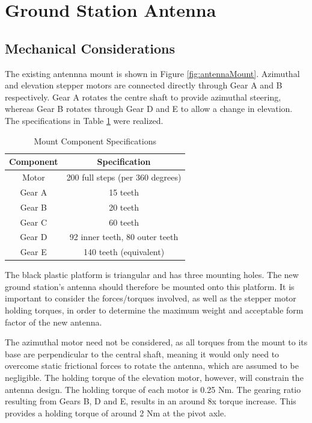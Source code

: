 \graphicspath{{./figures}}

\section{Ground Station Antenna}
\subsection{Mechanical Considerations}

The existing antennna mount is shown in Figure \ref{fig:antennaMount}. Azimuthal and elevation stepper motors are connected directly through Gear A and B respectively. Gear A rotates the centre shaft to provide azimuthal steering, whereas Gear B rotates through Gear D and E to allow a change in elevation. The 
specifications in Table \ref{tab:mount_specifications} were realized.

\begin{table}[!htb]
  \centering
  \renewcommand{\arraystretch}{1.2}
  \begin{tabular}{ |c|c| }
  \hline
  \textbf{Component}        & \textbf{Specification}    \\
  \hline
  Motor         & 200 full steps (per 360 degrees) \\ \hline
  Gear A        & 15 teeth \\ \hline
  Gear B        & 20 teeth \\ \hline
  Gear C        & 60 teeth \\ \hline
  Gear D        & 92 inner teeth, 80 outer teeth \\ \hline
  Gear E        & 140 teeth (equivalent) \\ \hline
  \end{tabular}
  \caption{Mount Component Specifications}
  \label{tab:mount_specifications}
\end{table}

The black plastic platform is triangular and has three mounting holes. The new ground station's antenna should therefore be mounted onto this platform. It is important to consider the forces/torques involved, as well as the stepper motor holding torques, in order to determine the maximum weight and acceptable form factor of the new antenna.

The azimuthal motor need not be considered, as all torques from the mount to its base are perpendicular to the central shaft, meaning it would only need to overcome static frictional forces to rotate the antenna, which are assumed to be negligible. The holding torque of the elevation motor, however, will constrain the antenna design. The holding torque of each motor is 0.25 Nm. The gearing ratio resulting from Gears B, D and E, results in an around 8x torque increase. This provides a holding torque of around 2 Nm at the pivot axle.

